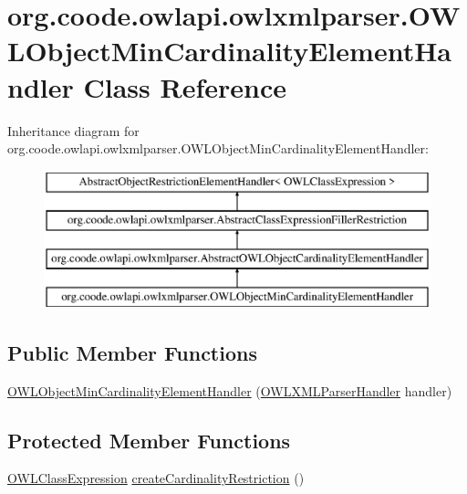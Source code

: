 \hypertarget{classorg_1_1coode_1_1owlapi_1_1owlxmlparser_1_1_o_w_l_object_min_cardinality_element_handler}{\section{org.\-coode.\-owlapi.\-owlxmlparser.\-O\-W\-L\-Object\-Min\-Cardinality\-Element\-Handler Class Reference}
\label{classorg_1_1coode_1_1owlapi_1_1owlxmlparser_1_1_o_w_l_object_min_cardinality_element_handler}
}
Inheritance diagram for org.\-coode.\-owlapi.\-owlxmlparser.\-O\-W\-L\-Object\-Min\-Cardinality\-Element\-Handler\-:\begin{figure}[H]
\begin{center}
\leavevmode
\includegraphics[height=4.000000cm]{classorg_1_1coode_1_1owlapi_1_1owlxmlparser_1_1_o_w_l_object_min_cardinality_element_handler}
\end{center}
\end{figure}
\subsection*{Public Member Functions}
\begin{DoxyCompactItemize}
\item 
\hyperlink{classorg_1_1coode_1_1owlapi_1_1owlxmlparser_1_1_o_w_l_object_min_cardinality_element_handler_adc3c612387cdd39ff063d589930462ed}{O\-W\-L\-Object\-Min\-Cardinality\-Element\-Handler} (\hyperlink{classorg_1_1coode_1_1owlapi_1_1owlxmlparser_1_1_o_w_l_x_m_l_parser_handler}{O\-W\-L\-X\-M\-L\-Parser\-Handler} handler)
\end{DoxyCompactItemize}
\subsection*{Protected Member Functions}
\begin{DoxyCompactItemize}
\item 
\hyperlink{interfaceorg_1_1semanticweb_1_1owlapi_1_1model_1_1_o_w_l_class_expression}{O\-W\-L\-Class\-Expression} \hyperlink{classorg_1_1coode_1_1owlapi_1_1owlxmlparser_1_1_o_w_l_object_min_cardinality_element_handler_a725bb429591942b618d51e806aae6ece}{create\-Cardinality\-Restriction} ()
\end{DoxyCompactItemize}


